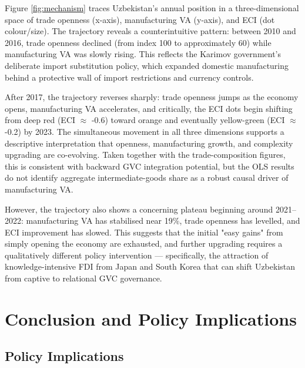 \documentclass[14pt,a4paper]{extarticle}
\begin{document}
Figure \ref{fig:mechanism} traces Uzbekistan's annual position in a three-dimensional space of trade openness (x-axis), manufacturing VA (y-axis), and ECI (dot colour/size). The trajectory reveals a counterintuitive pattern: between 2010 and 2016, trade openness declined (from index 100 to approximately 60) while manufacturing VA was slowly rising. This reflects the Karimov government's deliberate import substitution policy, which expanded domestic manufacturing behind a protective wall of import restrictions and currency controls.

After 2017, the trajectory reverses sharply: trade openness jumps as the economy opens, manufacturing VA accelerates, and critically, the ECI dots begin shifting from deep red (ECI $\approx$ -0.6) toward orange and eventually yellow-green (ECI $\approx$ -0.2) by 2023. The simultaneous movement in all three dimensions supports a descriptive interpretation that openness, manufacturing growth, and complexity upgrading are co-evolving. Taken together with the trade-composition figures, this is consistent with backward GVC integration potential, but the OLS results do not identify aggregate intermediate-goods share as a robust causal driver of manufacturing VA.

However, the trajectory also shows a concerning plateau beginning around 2021--2022: manufacturing VA has stabilised near 19\%, trade openness has levelled, and ECI improvement has slowed. This suggests that the initial "easy gains" from simply opening the economy are exhausted, and further upgrading requires a qualitatively different policy intervention --- specifically, the attraction of knowledge-intensive FDI from Japan and South Korea that can shift Uzbekistan from captive to relational GVC governance.


\newpage


\section{Conclusion and Policy Implications}
\subsection{Policy Implications}
\label{sec:policy}
\end{document}
